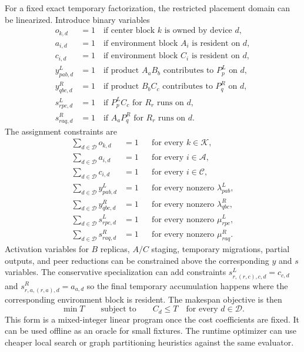 \documentclass[11pt]{article}
\begin{document}
For a fixed exact temporary factorization, the restricted placement domain can
be linearized.  Introduce binary variables
\begin{align}
  o_{k,d} &= 1 \quad \text{if center block } k \text{ is owned by device } d,\\
  a_{i,d} &= 1 \quad \text{if environment block } A_i \text{ is resident on } d,\\
  c_{i,d} &= 1 \quad \text{if environment block } C_i \text{ is resident on } d,\\
  y^L_{pab,d} &= 1 \quad \text{if product } A_aB_b \text{ contributes to } P^L_p
                  \text{ on } d,\\
  y^R_{qbc,d} &= 1 \quad \text{if product } B_bC_c \text{ contributes to } P^R_q
                  \text{ on } d,\\
  s^L_{rpc,d} &= 1 \quad \text{if } P^L_pC_c \text{ for } R_r \text{ runs on } d,\\
  s^R_{raq,d} &= 1 \quad \text{if } A_aP^R_q \text{ for } R_r \text{ runs on } d.
\end{align}
The assignment constraints are
\begin{align}
  \sum_{d \in \mathcal{D}} o_{k,d} &= 1
    &&\text{for every } k \in \mathcal{K},\\
  \sum_{d \in \mathcal{D}} a_{i,d} &= 1
    &&\text{for every } i \in \mathcal{A},\\
  \sum_{d \in \mathcal{D}} c_{i,d} &= 1
    &&\text{for every } i \in \mathcal{C},\\
  \sum_{d \in \mathcal{D}} y^L_{pab,d} &= 1
    &&\text{for every nonzero } \lambda^L_{pab},\\
  \sum_{d \in \mathcal{D}} y^R_{qbc,d} &= 1
    &&\text{for every nonzero } \lambda^R_{qbc},\\
  \sum_{d \in \mathcal{D}} s^L_{rpc,d} &= 1
    &&\text{for every nonzero } \mu^L_{rpc},\\
  \sum_{d \in \mathcal{D}} s^R_{raq,d} &= 1
    &&\text{for every nonzero } \mu^R_{raq}.
\end{align}
Activation variables for $B$ replicas, $A/C$ staging, temporary migrations,
partial outputs, and peer reductions can be constrained above the corresponding
$y$ and $s$ variables.  The conservative specialization can add constraints
$s^L_{r,(r,c),c,d} = c_{c,d}$ and $s^R_{r,a,(r,a),d} = a_{a,d}$ so the final
temporary accumulation happens where the corresponding environment block is
resident.  The makespan objective is then
\begin{equation}
  \min T
  \qquad \text{subject to} \qquad
  C_d \le T \quad \text{for every } d \in \mathcal{D}.
\end{equation}
This form is a mixed-integer linear program once the cost coefficients are
fixed.  It can be used offline as an oracle for small fixtures.  The runtime
optimizer can use cheaper local search or graph partitioning heuristics against
the same evaluator.
\end{document}
